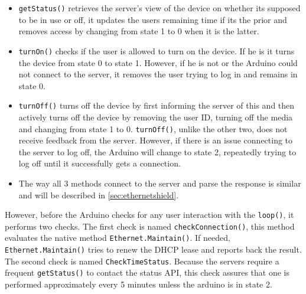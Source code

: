 \begin{itemize}
	\item \verb|getStatus()| retrieves the server's view of the device on whether its supposed to be in use or off, it updates the users remaining time if its the prior and removes access by changing from state 1 to 0 when it is the latter.
	\item \verb|turnOn()| checks if the user is allowed to turn on the device. If he is it turns the device from state 0 to state 1. However, if he is not or the Arduino could not connect to the server, it removes the user trying to log in and remains in state 0.
	\item \verb|turnOff()| turns off the device by first informing the server of this and then actively turns off the device by removing the user ID, turning off the media and changing from state 1 to 0. \verb|turnOff()|, unlike the other two, does not receive feedback from the server. However, if there is an issue connecting to the server to log off, the Arduino will change to state 2, repeatedly trying to log off until it successfully gets a connection.
	\item The way all 3 methods connect to the server and parse the response is similar and will be described in \autoref{sec:ethernetshield}.
\end{itemize}
However, before the Arduino checks for any user interaction with the \verb|loop()|, it performs two checks.
The first check is named \verb|checkConnection()|, this method evaluates the native method \verb|Ethernet.Maintain()|.
If needed, \verb|Ethernet.Maintain()| tries to renew the DHCP lease and reports back the result.\newline
The second check is named \verb|CheckTimeStatus|. Because the servers require a frequent \verb|getStatus()| to contact the status API, this check assures that one is performed approximately every 5 minutes unless the arduino is in state 2.


